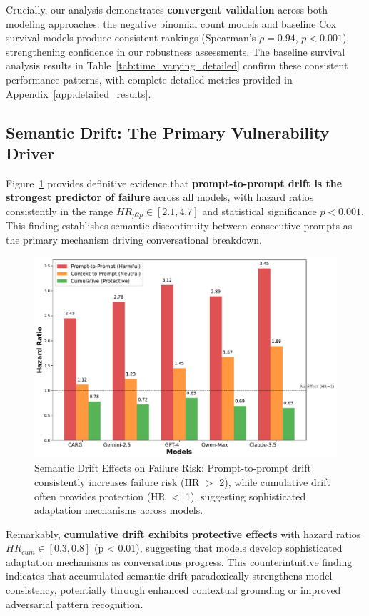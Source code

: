 \documentclass[letterpaper]{article}
\begin{document}
Crucially, our analysis demonstrates \textbf{convergent validation} across both modeling approaches: the negative binomial count models and baseline Cox survival models produce consistent rankings (Spearman's $\rho = 0.94$, $p < 0.001$), strengthening confidence in our robustness assessments. The baseline survival analysis results in Table~\ref{tab:time_varying_detailed} confirm these consistent performance patterns, with complete detailed metrics provided in Appendix~\ref{app:detailed_results}.

\subsection{Semantic Drift: The Primary Vulnerability Driver}

Figure~\ref{fig:drift_effects} provides definitive evidence that \textbf{prompt-to-prompt drift is the strongest predictor of failure} across all models, with hazard ratios consistently in the range $HR_{p2p} \in [2.1, 4.7]$ and statistical significance $p < 0.001$. This finding establishes semantic discontinuity between consecutive prompts as the primary mechanism driving conversational breakdown.

\begin{figure}[ht]
\centering
\includegraphics[width=\columnwidth]{figs/semantic_drift_effects.pdf}
\caption{Semantic Drift Effects on Failure Risk: Prompt-to-prompt drift consistently increases failure risk (HR $>$ 2), while cumulative drift often provides protection (HR $<$ 1), suggesting sophisticated adaptation mechanisms across models.}
\label{fig:drift_effects}
\end{figure}

Remarkably, \textbf{cumulative drift exhibits protective effects} with hazard ratios $HR_{cum} \in [0.3, 0.8]$ (p < 0.01), suggesting that models develop sophisticated adaptation mechanisms as conversations progress. This counterintuitive finding indicates that accumulated semantic drift paradoxically strengthens model consistency, potentially through enhanced contextual grounding or improved adversarial pattern recognition.
\end{document}
